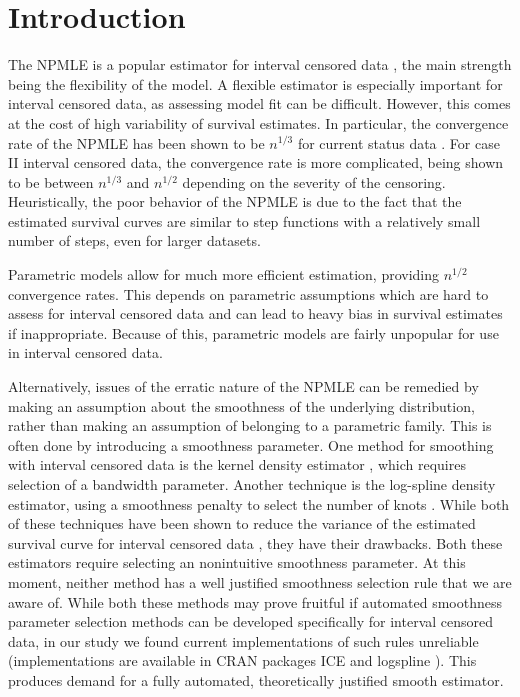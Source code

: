{\section{Introduction}
\label{sec:intro}	}

	The NPMLE is a popular estimator for interval censored data \cite{RefT1976}, the main strength being the flexibility of the model. A flexible estimator is especially important for interval censored data, as assessing model fit can be difficult. However, this comes at the cost of high variability of survival estimates. In particular, the convergence rate of the NPMLE has been shown to be $n^{1/3}$ for current status data \cite{RefG1987}. For case II interval censored data, the convergence rate is more complicated, being shown to be between $ n^{1/3}$ \cite{RefG1991} and $n^{1/2}$ \cite{RefH1999} depending on the severity of the censoring. Heuristically, the poor behavior of the NPMLE is due to the fact that the estimated survival curves are similar to step functions with a relatively small number of steps, even for larger datasets.

	Parametric models allow for much more efficient estimation, providing $n^{1/2}$ convergence rates. This depends on parametric assumptions which are hard to assess for interval censored data and can lead to heavy bias in survival estimates if inappropriate. Because of this, parametric models are fairly unpopular for use in interval censored data. 	
	
	Alternatively, issues of the erratic nature of the NPMLE can be remedied by making an assumption about the smoothness of the underlying distribution, rather than making an assumption of belonging to a parametric family.  This is often done by introducing a smoothness parameter. One method for smoothing with interval censored data is the kernel density estimator \cite{RefBea2005}, which requires selection of a bandwidth parameter. Another technique is the log-spline density estimator, using a smoothness penalty to select the number of knots \cite{RefKS1992}. While both of these techniques have been shown to reduce the variance of the estimated survival curve for interval censored data \cite{RefP2000}, they have their drawbacks. Both these estimators require selecting an nonintuitive smoothness parameter. At this moment, neither method has a well justified smoothness selection rule that we are aware of. While both these methods may prove fruitful if automated smoothness parameter selection methods can be developed specifically for interval censored data, in our study we found current implementations of such rules unreliable (implementations are available in CRAN \cite{R} packages ICE \cite{R_ICE} and logspline \cite{R_logSpline}). This produces demand for a fully automated, theoretically justified smooth estimator. 
	
